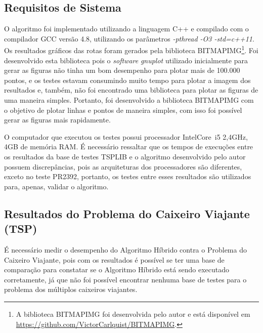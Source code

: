 \documentclass[12pt,openright,a4paper,twoside]{tcc}
\begin{document}
        \subsection{Requisitos de Sistema}

		O algoritmo foi implementado utilizando a linguagem C++ e compilado com o compilador GCC versão 4.8, utilizando os parâmetros \textit{-pthread -O3 -std=c++11}. Os resultados gráficos das rotas foram gerados pela biblioteca BITMAPIMG\footnote{A biblioteca BITMAPIMG foi desenvolvida pelo autor e está disponível em \url{https://github.com/VictorCarlquist/BITMAPIMG}.}. Foi desenvolvido esta biblioteca pois o \textit{software} \textit{gnuplot} utilizado inicialmente para gerar as figuras não tinha um bom desempenho para plotar mais de 100.000 pontos, e os testes estavam consumindo muito tempo para plotar a imagem dos resultados e, também,  não foi encontrado uma biblioteca para plotar as figuras de uma maneira simples. Portanto, foi desenvolvido a biblioteca BITMAPIMG com o objetivo de plotar linhas e pontos de maneira simples, com isso foi possível gerar as figuras mais rapidamente.

		O computador que executou os testes possui processador Intel\textregistered Core\texttrademark ~i5 2,4GHz, 4GB de memória RAM. É necessário ressaltar que os tempos de execuções entre os resultados da base de testes TSPLIB e o algoritmo desenvolvido pelo autor possuem discrepâncias, pois as arquiteturas dos processadores são diferentes, exceto no teste PR2392, portanto, os testes entre esses resultados são utilizados para, apenas, validar o algoritmo.

		\subsection{Resultados do Problema do Caixeiro Viajante (TSP)}

		É necessário medir o desempenho do Algoritmo Híbrido contra o Problema do Caixeiro Viajante, pois com os resultados é possível se ter uma base de comparação para constatar se o Algoritmo Híbrido está sendo executado corretamente, já que não foi possível encontrar nenhuma base de testes para o problema dos múltiplos caixeiros viajantes.
\end{document}
